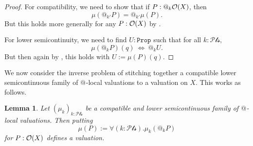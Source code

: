 \documentclass[11pt, oneside, article]{memoir}
\makeatletter
\theoremstyle{plain}
\newtheorem{lemma}[theorem]{Lemma}
\theoremstyle{definition}
\theoremstyle{remark}
\newcommand{\const}[1]{\mathtt{#1}}
\newcommand{\prop}{\const{Prop}}
\newcommand{\Op}[1][undef]{\ifthenelse{\equal{#1}{undef}}{\mathcal{O}}{\mathcal{O}(#1)}}
\newcommand{\pt}{k}				%
\newcommand{\Pts}{\mathcal{Pts}}		%
\newcommand{\AtSymbol}{{@}}
\newcommand{\At}[1][\pt]{\AtSymbol_{#1}}
\makeatother
\begin{document}
\begin{proof}
	For compatibility, we need to show that if $P : \At \Op[X]$, then
	\[
		\mu( \At[\pt'] P ) = \At[\pt'] \mu(P).
	\]
	But this holds more generally for any $P:\Op[X]$ by .

	For lower semicontinuity, we need to find $U : \prop$ such that for all $\pt : \Pts$,
	\[
		\mu(\At P)(q) \: \Leftrightarrow \: \At U.
	\]
	But then again by , this holds with $U := \mu(P)(q)$.
\end{proof}

We now consider the inverse problem of stitching together a compatible lower semicontinuous family of $\At[]$-local valuations to a valuation on $X$. This works as follows.

\begin{lemma}\label{lemma.compat_lowersemi_stitched}
	Let $(\mu_\pt)_{\pt : \Pts}$ be a compatible and lower semicontinuous family of $\At[]$-local valuations. Then putting
	\begin{equation}
		\label{mu_stitched}
		\mu(P) := \forall (\pt : \Pts) . \mu_\pt(\At P)
	\end{equation}
	for $P : \Op[X]$ defines a valuation.
\end{lemma}
\end{document}
